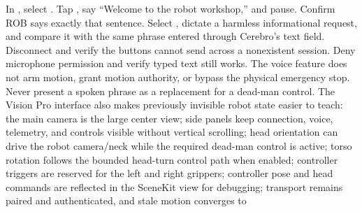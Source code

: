 In , select .\markdownRendererOlItemEnd 
{}Tap , say “Welcome to the robot workshop,” and pause. Confirm ROB\markdownRendererSoftLineBreak
{}says exactly that sentence.\markdownRendererOlItemEnd 
{}Select , dictate a harmless informational request, and compare it\markdownRendererSoftLineBreak
{}with the same phrase entered through Cerebro's text field.\markdownRendererOlItemEnd 
{}Disconnect and verify the buttons cannot send across a nonexistent session.\markdownRendererOlItemEnd 
{}Deny microphone permission and verify typed text still works.\markdownRendererOlItemEnd 
\markdownRendererOlEnd \markdownRendererInterblockSeparator
{}The voice feature does not arm motion, grant motion authority, or bypass the\markdownRendererSoftLineBreak
{}physical emergency stop. Never present a spoken phrase as a replacement for a\markdownRendererSoftLineBreak
{}dead-man control.\markdownRendererInterblockSeparator
{}
\markdownRendererSectionEnd \markdownRendererSectionBegin
{}\markdownRendererInterblockSeparator
{}The Vision Pro interface also makes previously invisible robot state easier to\markdownRendererSoftLineBreak
{}teach:\markdownRendererInterblockSeparator
{}\markdownRendererUlBegin
\markdownRendererUlItem the main camera is the large center view;\markdownRendererUlItemEnd 
\markdownRendererUlItem side panels keep connection, voice, telemetry, and controls visible without\markdownRendererSoftLineBreak
{}vertical scrolling;\markdownRendererUlItemEnd 
\markdownRendererUlItem head orientation can drive the robot camera/neck while the required\markdownRendererSoftLineBreak
{}dead-man control is active;\markdownRendererUlItemEnd 
\markdownRendererUlItem torso rotation follows the bounded head-turn control path when enabled;\markdownRendererUlItemEnd 
\markdownRendererUlItem controller triggers are reserved for the left and right grippers;\markdownRendererUlItemEnd 
\markdownRendererUlItem controller pose and head commands are reflected in the SceneKit view for\markdownRendererSoftLineBreak
{}debugging;\markdownRendererUlItemEnd 
\markdownRendererUlItem transport remains paired and authenticated, and stale motion converges to\markdownRendererSoftLineBreak
